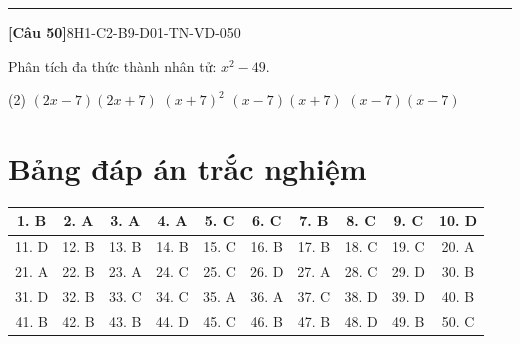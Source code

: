 \documentclass[12pt,a4paper]{article}
\newif\ifloigiai
\newenvironment{cauhoi}[2]{%
  \par\medskip\noindent\rule{\textwidth}{0.4pt}\par\nopagebreak
  \noindent\textbf{[#1]}\hfill{\scriptsize\ttfamily #2}\par\nopagebreak\smallskip}{\par}
\newcommand{\dapan}[1]{\ifloigiai\par\smallskip\noindent\textit{Đáp án:} \textbf{#1}\par\fi}
\begin{document}
\begin{cauhoi}{Câu 50}{8H1-C2-B9-D01-TN-VD-050}
Phân tích đa thức thành nhân tử: $x^{2} - 49$.
\begin{tasks}(2)
\task $(2x - 7)(2x + 7)$
\task $(x + 7)^{2}$
\task $(x - 7)(x + 7)$
\task $(x - 7)(x - 7)$
\end{tasks}
\dapan{C}
\end{cauhoi}
\clearpage\section*{Bảng đáp án trắc nghiệm}
\begin{center}\begin{tabular}{|c|c|c|c|c|c|c|c|c|c|}
\hline
1. B & 2. A & 3. A & 4. A & 5. C & 6. C & 7. B & 8. C & 9. C & 10. D\\\hline
11. D & 12. B & 13. B & 14. B & 15. C & 16. B & 17. B & 18. C & 19. C & 20. A\\\hline
21. A & 22. B & 23. A & 24. C & 25. C & 26. D & 27. A & 28. C & 29. D & 30. B\\\hline
31. D & 32. B & 33. C & 34. C & 35. A & 36. A & 37. C & 38. D & 39. D & 40. B\\\hline
41. B & 42. B & 43. B & 44. D & 45. C & 46. B & 47. B & 48. D & 49. B & 50. C\\\hline
\end{tabular}\end{center}
\end{document}
